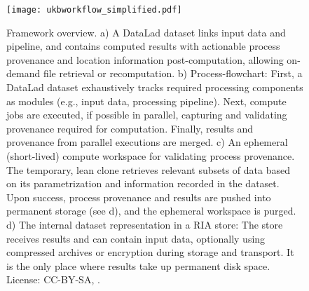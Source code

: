\begin{figure}
	\centering
	\texttt{[image: ukbworkflow\_simplified.pdf]}
	\caption[FAIRly big: Framework overview]{Framework overview. a) A DataLad dataset links input data and pipeline, and contains computed results with actionable process provenance and location information post-computation, allowing on-demand file retrieval or recomputation. b) Process-flowchart: First, a DataLad dataset exhaustively tracks required processing components as modules (e.g., input data, processing pipeline). Next, compute jobs are executed, if possible in parallel, capturing and validating provenance required for computation. Finally, results and provenance from parallel executions are merged. c) An ephemeral (short-lived) compute workspace for validating process provenance. The temporary, lean clone retrieves relevant subsets of data based on its parametrization and information recorded in the dataset. Upon success, process provenance and results are pushed into permanent storage (see d), and the ephemeral workspace is purged. d) The internal dataset representation in a RIA store: The store receives results and can contain input data, optionally using compressed archives or encryption during storage and transport. It is the only place where results take up permanent disk space. License: CC-BY-SA, \citet{wagner2022fairly}.}
	\label{fig:fairly_workflow}
\end{figure}


